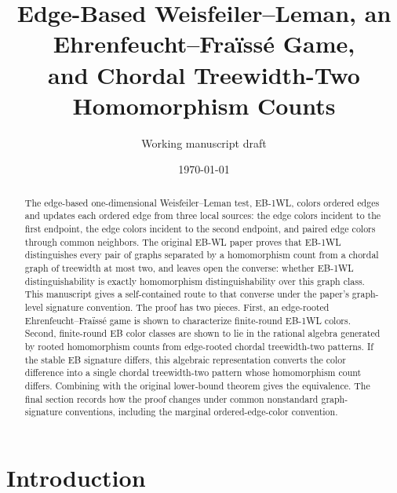 \documentclass[11pt]{article}
\title{Edge-Based Weisfeiler--Leman, an Ehrenfeucht--Fra\"iss\'e Game,\\
 and Chordal Treewidth-Two Homomorphism Counts}
\author{Working manuscript draft}
\date{\today}
\begin{document}
\maketitle

\begin{abstract}
The edge-based one-dimensional Weisfeiler--Leman test, EB-1WL, colors ordered edges and updates each ordered edge from three local sources: the edge colors incident to the first endpoint, the edge colors incident to the second endpoint, and paired edge colors through common neighbors.  The original EB-WL paper proves that EB-1WL distinguishes every pair of graphs separated by a homomorphism count from a chordal graph of treewidth at most two, and leaves open the converse: whether EB-1WL distinguishability is exactly homomorphism distinguishability over this graph class.  This manuscript gives a self-contained route to that converse under the paper's graph-level signature convention.  The proof has two pieces.  First, an edge-rooted Ehrenfeucht--Fra\"iss\'e game is shown to characterize finite-round EB-1WL colors.  Second, finite-round EB color classes are shown to lie in the rational algebra generated by rooted homomorphism counts from edge-rooted chordal treewidth-two patterns.  If the stable EB signature differs, this algebraic representation converts the color difference into a single chordal treewidth-two pattern whose homomorphism count differs.  Combining with the original lower-bound theorem gives the equivalence.  The final section records how the proof changes under common nonstandard graph-signature conventions, including the marginal ordered-edge-color convention.
\end{abstract}

\begin{center}
\end{center}

\tableofcontents

\section{Introduction}
\end{document}
